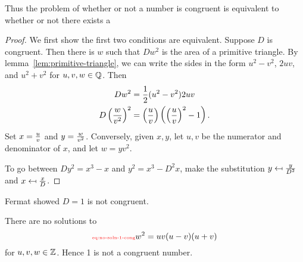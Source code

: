 
Thus the problem of whether or not a number is congruent is equivalent to whether or not there exists a 

\begin{proof}
We first show the first two conditions are equivalent. 
Suppose $D$ is congruent. 
Then there is $w$ such that $Dw^2$ is the area of a primitive triangle. 
By lemma~\ref{lem:primitive-triangle}, we can write the sides in the form $u^2-v^2$, $2uv$, and $u^2+v^2$ for $u,v,w\in \mathbb{Q}$. Then
\begin{align*}
Dw^2&=\frac{1}{2}(u^2-v^2)2uv\\
D\left( {\frac{w}{v^2}} \right)^2&=\left( {\frac{u}{v}} \right)\left( {\left( {\frac{u}{v}} \right)^2-1} \right).
\end{align*}
Set $x=\frac{u}{v}$ and $y=\frac{w}{v^2}$. Conversely, given $x,y$, let $u,v$ be the numerator and denominator of $x$, and let $w=yv^2$.

To go between $Dy^2=x^3-x$ and $y^2=x^3-D^2x$, make the substitution $y\mapsfrom \frac{y}{D^2}$ and $x\mapsfrom \frac{x}{D}$.
\end{proof}
Fermat showed $D=1$ is not congruent.
\begin{thm}
There are no solutions to
\begin{equation}\llabel{eq:no-soln-1-cong}
w^2=uv(u-v)(u+v)
\end{equation}
for $u,v,w\in \mathbb{Z}$. Hence 1 is not a congruent number.
\end{thm}
